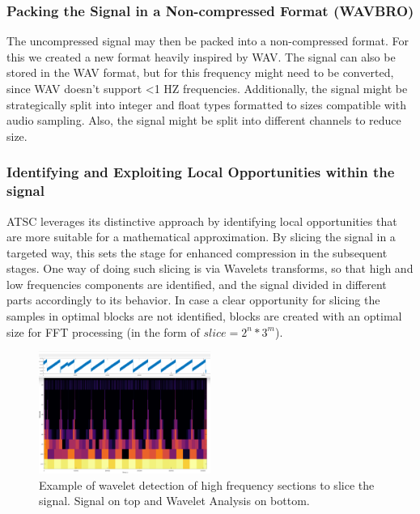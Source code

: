 \documentclass[conference]{IEEEtran}
\begin{document}
\vspace{10pt}
\subsubsection{Packing the Signal in a Non-compressed Format (WAVBRO)}
The uncompressed signal may then be packed into a non-compressed format. For this we created a new format heavily inspired by WAV. The signal can also be stored in the WAV format, but for this frequency might need to be converted, since WAV doesn't support <1 HZ frequencies. Additionally, the signal might be strategically split into integer and float types formatted to sizes compatible with audio sampling. Also, the signal might be split into different channels to reduce size. 

\vspace{10pt}
\subsubsection{Identifying and Exploiting Local Opportunities within the signal}
ATSC leverages its distinctive approach by identifying local opportunities that are more suitable for a mathematical approximation. By slicing the signal in a targeted way, this sets the stage for enhanced compression in the subsequent stages. One way of doing such slicing is via Wavelets transforms, so that high and low frequencies components are identified, and the signal divided in different parts accordingly to its behavior.
In case a clear opportunity for slicing the samples in optimal blocks are not identified, blocks are created with an optimal size for FFT processing (in the form of $slice = 2^n * 3^m$).

\begin{figure}[ht]
  \centering
  \includegraphics[width=0.5\textwidth]{wavelet_heap.png}
  \caption{Example of wavelet detection of high frequency sections to slice the signal. Signal on top and Wavelet Analysis on bottom.}
  \label{wavelet}
\end{figure}
\vspace{5pt}
\end{document}
